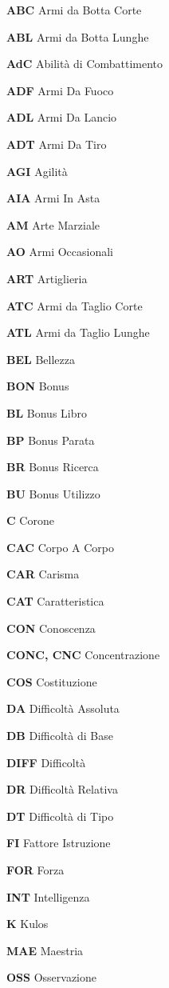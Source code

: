 \begin{description}
\itemsep -4pt
\item{\bf ABC} Armi da Botta Corte 
\item{\bf ABL} Armi da Botta Lunghe 
\item{\bf AdC} Abilit\`a di Combattimento
\item{\bf ADF} Armi Da Fuoco 
\item{\bf ADL} Armi Da Lancio 
\item{\bf ADT} Armi Da Tiro 
\item{\bf AGI} Agilit\`a 
\item{\bf AIA} Armi In Asta 
\item{\bf AM} Arte Marziale
\item{\bf AO} Armi Occasionali 
\item{\bf ART} Artiglieria 
\item{\bf ATC} Armi da Taglio Corte 
\item{\bf ATL} Armi da Taglio Lunghe 
\item{\bf BEL} Bellezza 
\item{\bf BON} Bonus 
\item{\bf BL} Bonus Libro 
\item{\bf BP} Bonus Parata 
\item{\bf BR} Bonus Ricerca 
\item{\bf BU} Bonus Utilizzo 
\item{\bf C} Corone 
\item{\bf CAC} Corpo A Corpo 
\item{\bf CAR} Carisma 
\item{\bf CAT} Caratteristica
\item{\bf CON} Conoscenza 
\item{\bf CONC, CNC} Concentrazione 
\item{\bf COS} Costituzione 
\item{\bf DA} Difficolt\`a Assoluta
\item{\bf DB} Difficolt\`a di Base 
\item{\bf DIFF} Difficolt\`a 
\item{\bf DR} Difficolt\`a Relativa
\item{\bf DT} Difficolt\`a di Tipo 
\item{\bf FI} Fattore Istruzione 
\item{\bf FOR} Forza 
\item{\bf INT} Intelligenza
\item{\bf K} Kulos 
\item{\bf MAE} Maestria 
\item{\bf OSS} Osservazione 

\end{description}
